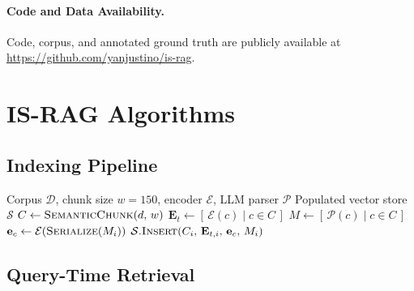 \documentclass[11pt,a4paper]{article}
\begin{document}
\paragraph*{Code and Data Availability.}
Code, corpus, and annotated ground truth are publicly available at
\url{https://github.com/yanjustino/is-rag}.



\appendix
\setcounter{section}{0}
\renewcommand{\thesection}{\Alph{section}}

\pagebreak
\section{IS-RAG Algorithms}
\label{app:algorithms}

\subsection{Indexing Pipeline}

\begin{algorithm}[h]
\caption{IS-RAG Indexing}\label{alg:index}
\begin{algorithmic}[1]
\Require Corpus $\mathcal{D}$, chunk size $w{=}150$,
         encoder $\mathcal{E}$, LLM parser $\mathcal{P}$
\Ensure  Populated vector store $\mathcal{S}$
  \State $C \gets \textsc{SemanticChunk}(d,\,w)$
  \State $\mathbf{E}_t \gets [\,\mathcal{E}(c) \mid c \in C\,]$
  \State $M \gets [\,\mathcal{P}(c) \mid c \in C\,]$
    \State $\mathbf{e}_c \gets \mathcal{E}(\textsc{Serialize}(M_i))$
    \State $\mathcal{S}.\textsc{Insert}(C_i,\,\mathbf{E}_{t,i},\,\mathbf{e}_c,\,M_i)$
  \EndFor
\EndFor
\end{algorithmic}
\end{algorithm}

\subsection{Query-Time Retrieval}
\end{document}
